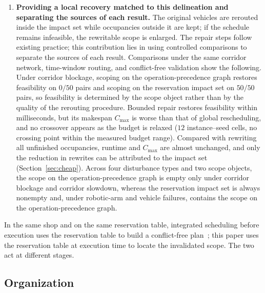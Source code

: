 \documentclass[manuscript,screen,review]{acmart}
\newcommand{\NPairs}{50}
\newcommand{\FeasRone}{0/\NPairs}            %
\newcommand{\FeasRtwo}{\NPairs/\NPairs}      %
\newcommand{\EfiveCells}{12}        %
\begin{document}
\begin{enumerate}[label=\textbf{C\arabic*.},leftmargin=2.2em,itemsep=0.4em]
\item \textbf{Providing a local recovery matched to this delineation and separating the sources of each result.}
The original vehicles are rerouted inside the impact set while occupancies outside it are kept; if the schedule remains infeasible, the rewritable scope is enlarged.
The repair steps follow existing practice; this contribution lies in using controlled comparisons to separate the sources of each result.
Comparisons under the same corridor network, time-window routing, and conflict-free validation show the following.
Under corridor blockage, scoping on the operation-precedence graph restores feasibility on \(\FeasRone\) pairs and scoping on the reservation impact set on \(\FeasRtwo\) pairs,
so feasibility is determined by the scope object rather than by the quality of the rerouting procedure.
Bounded repair restores feasibility within milliseconds, but its makespan \(C_{\max}\) is worse than that of global rescheduling,
and no crossover appears as the budget is relaxed (\(\EfiveCells\) instance--seed cells, no crossing point within the measured budget range).
Compared with rewriting all unfinished occupancies, runtime and \(C_{\max}\) are almost unchanged,
and only the reduction in rewrites can be attributed to the impact set (Section~\ref{sec:cheap}).
Across four disturbance types and two scope objects, the scope on the operation-precedence graph is empty only under corridor blockage and corridor slowdown,
whereas the reservation impact set is always nonempty and, under robotic-arm and vehicle failures, contains the scope on the operation-precedence graph.
\end{enumerate}

In the same shop and on the same reservation table, integrated scheduling before execution uses the reservation table to build a conflict-free plan~\cite{vanos2026exact,li2026framework,sun2023integrated}; this paper uses the reservation table at execution time to locate the invalidated scope. The two act at different stages.

\subsection{Organization}
\end{document}
